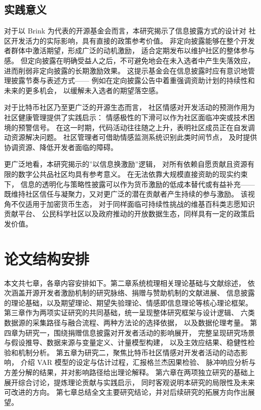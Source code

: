 \subsection{实践意义}

对于以 Brink 为代表的开源基金会而言，本研究揭示了信息披露方式的设计对
社区开发活力的实际影响，具有直接的政策参考价值。
非定向披露能够在整个开发者群体中激活期望，形成广泛的动机激励，
适合定期发布以维护社区的整体参与感。
但定向披露在明确受益人之后，不可避免地会在未入选者中产生失落效应，
进而削弱非定向披露的长期激励效果。
这提示基金会在信息披露时应有意识地管理披露节奏与表述方式——
例如在定向披露公告中着重强调资助计划的持续性和未来的更多机会，
以缓解未入选者的期望落空感。

对于比特币社区乃至更广泛的开源生态而言，
社区情感对开发活动的预测作用为社区健康管理提供了实践启示：
情感极性的下滑可以作为社区面临冲突或技术困境的预警信号。
在这一时期，代码活动往往随之上升，表明社区成员正在自发调动资源解决问题。
社区管理者可借助情感监测系统识别此类时间节点，
及时提供协调资源、降低开发者面临的障碍。

更广泛地看，本研究揭示的”以信息换激励”逻辑，
对所有依赖自愿贡献且资源有限的数字公共品社区均具有参考意义。
在无法依靠大规模直接资助的现实约束下，
信息的透明化与策略性披露可以作为货币激励的低成本替代或有益补充——
既维持社区信任与凝聚力，又对更广泛的潜在贡献者产生持续的参与激励。
该视角不仅适用于加密货币生态，
对于同样面临可持续性挑战的维基百科类志愿知识贡献平台、
公民科学社区以及政府推动的开放数据生态，同样具有一定的政策启发价值。

\section{论文结构安排}

本文共七章，各章内容安排如下。第二章系统梳理相关理论基础与文献综述，
依次涵盖开源开发者激励机制的研究脉络、捐赠与赞助机制的文献进展、
信息披露的理论基础，以及期望理论、期望失验理论、情感即信息理论等核心理论框架。
第三章作为两项实证研究的共同基础，统一呈现整体研究框架与设计逻辑、
六类数据源的采集路径与融合流程、两种方法论的选择依据，
以及数据伦理考量。
第四章为研究一，围绕捐赠信息披露对开发者活动的影响展开，
完整呈现研究场景与假设推导、数据来源与变量定义、计量模型构建，
以及主效应结果、稳健性检验和机制分析。
第五章为研究二，聚焦比特币社区情感对开发者活动的动态影响，
介绍 VAR 模型的设定与估计过程，汇报格兰杰因果检验、
脉冲响应分析与方差分解的结果，并对影响路径给出理论解释。
第六章在两项独立研究的基础上展开综合讨论，提炼理论贡献与实践启示，
同时客观说明本研究的局限性及未来可改进的方向。
第七章总结全文主要研究结论，并对后续研究的拓展方向作出展望。


